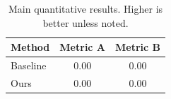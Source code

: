 \begin{table}[t]
  \centering
  \caption{Main quantitative results. Higher is better unless noted.}
  \label{tab:results}
  \begin{tabular}{lcc}
    \toprule
    Method & Metric A & Metric B \\
    \midrule
    Baseline & 0.00 & 0.00 \\
    Ours & 0.00 & 0.00 \\
    \bottomrule
  \end{tabular}
\end{table}
